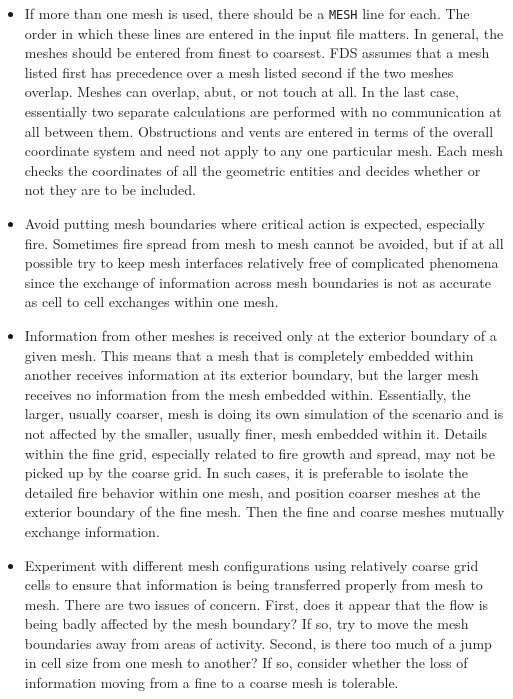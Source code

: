 \documentclass[11pt]{book}
\newcommand{\ct}{\tt\small}
\begin{document}
\begin{itemize}
\item If more than one mesh is used, there should be a
{\ct MESH} line for each. The order in which these
lines are entered in the input file matters. In general, the meshes should be entered
from finest to coarsest. FDS assumes that a mesh listed first has
precedence over a mesh listed second if the two meshes overlap.
Meshes can overlap, abut, or not touch at all. In the last case, essentially two separate
calculations are performed with no communication at all between them. Obstructions and vents are entered
in terms of the overall coordinate system and need not apply to any one particular mesh.
Each mesh checks the coordinates of all the geometric
entities and decides whether or not they are to be included.
\item Avoid putting mesh boundaries where critical action is expected,
especially fire. Sometimes fire spread from mesh to mesh cannot be
avoided, but if at all possible try to keep mesh interfaces relatively
free of complicated phenomena since the exchange of information across
mesh boundaries is not as accurate as cell to cell exchanges within one
mesh.
\item Information from other meshes is received only at the exterior boundary
of a given mesh. This means that a mesh that is completely embedded within
another receives information at its exterior boundary, but the larger
mesh receives no information from the mesh embedded within. Essentially,
the larger, usually coarser, mesh is doing its own simulation of the scenario
and is not affected by the smaller, usually finer, mesh embedded within it.
Details within the fine grid, especially related to fire growth and spread,
may not be picked up by the coarse grid. In such cases, it is preferable to
isolate the detailed fire behavior within one mesh, and position coarser
meshes at the exterior boundary of the fine mesh. Then the fine and coarse
meshes mutually exchange information.
\item Experiment with different mesh configurations using relatively
coarse grid cells to ensure that information is being transferred
properly from mesh to mesh. There are two issues of concern. First,
does it appear that the flow is being badly affected by the mesh boundary? If so,
try to move the mesh boundaries away from areas of activity. Second,
is there too much of a jump in cell size from one mesh to another? If so, consider
whether the loss of information moving from a fine to a coarse mesh is tolerable.

\end{itemize}
\end{document}
